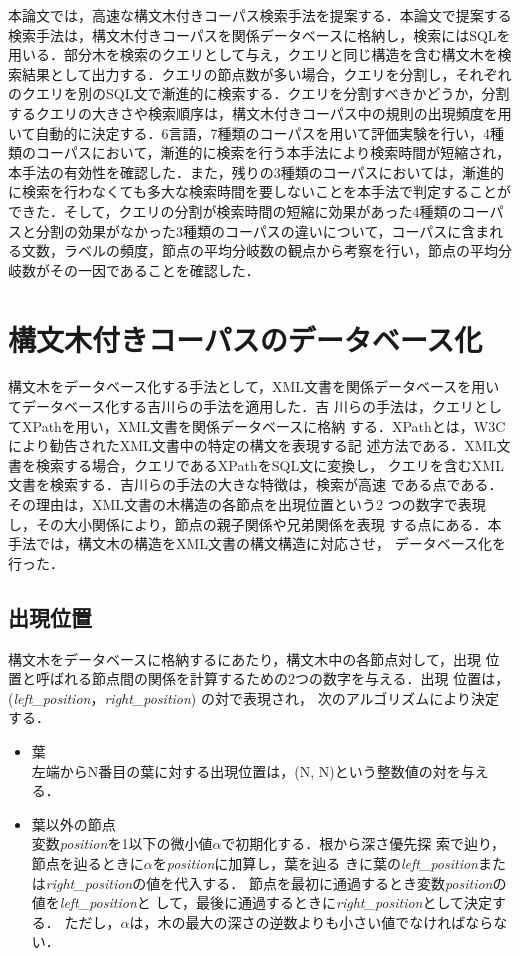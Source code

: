 \documentclass[japanese]{jnlp_1.3e}
\begin{document}
本論文では，高速な構文木付きコーパス検索手法を提案する．本論文で提案する検索手法は，構文木付きコーパスを関係データベースに格納し，検索にはSQLを用いる．部分木を検索のクエリとして与え，クエリと同じ構造を含む構文木を検索結果として出力する．クエリの節点数が多い場合，クエリを分割し，それぞれのクエリを別のSQL文で漸進的に検索する．クエリを分割すべきかどうか，分割するクエリの大きさや検索順序は，構文木付きコーパス中の規則の出現頻度を用いて自動的に決定する．6言語，7種類のコーパスを用いて評価実験を行い，4種類のコーパスにおいて，漸進的に検索を行う本手法により検索時間が短縮され，本手法の有効性を確認した．また，残りの3種類のコーパスにおいては，漸進的に検索を行わなくても多大な検索時間を要しないことを本手法で判定することができた．そして，クエリの分割が検索時間の短縮に効果があった4種類のコーパスと分割の効果がなかった3種類のコーパスの違いについて，コーパスに含まれる文数，ラベルの頻度，節点の平均分岐数の観点から考察を行い，節点の平均分岐数がその一因であることを確認した．


\section{構文木付きコーパスのデータベース化}
\label{database}

構文木をデータベース化する手法として，XML文書を関係データベースを用い
てデータベース化する吉川らの手法を適用した\cite{yoshikawa:1999:a}．吉
川らの手法は，クエリとしてXPathを用い，XML文書を関係データベースに格納
する．XPathとは，W3Cにより勧告されたXML文書中の特定の構文を表現する記
述方法である．XML文書を検索する場合，クエリであるXPathをSQL文に変換し，
クエリを含むXML文書を検索する．吉川らの手法の大きな特徴は，検索が高速
である点である．その理由は，XML文書の木構造の各節点を出現位置という2
つの数字で表現し，その大小関係により，節点の親子関係や兄弟関係を表現
する点にある．本手法では，構文木の構造をXML文書の構文構造に対応させ，
データベース化を行った．


\subsection{出現位置}

構文木をデータベースに格納するにあたり，構文木中の各節点対して，出現
位置と呼ばれる節点間の関係を計算するための2つの数字を与える．出現
位置は，({\it left\_position}，{\it right\_position}) の対で表現され，
次のアルゴリズムにより決定する．

\begin{itemize}
\item 葉\\
左端からN番目の葉に対する出現位置は，(N, N)という整数値の対を与える．
\item 葉以外の節点\\
変数{\it position}を1以下の微小値$\alpha$で初期化する．根から深さ優先探
索で辿り，節点を辿るときに$\alpha$を{\it position}に加算し，葉を辿る
きに葉の{\it left\_position}または{\it right\_position}の値を代入する．
節点を最初に通過するとき変数{\it position}の値を{\it left\_position}と
して，最後に通過するときに{\it right\_position}として決定する．
ただし，$\alpha$は，木の最大の深さの逆数よりも小さい値でなければならない．
\end{itemize}
\end{document}
